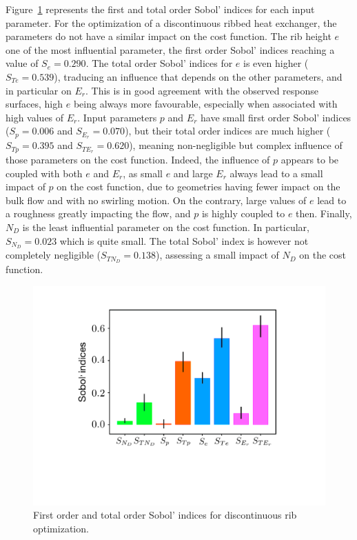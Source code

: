 Figure~\ref{sensitivity} represents the first and total order Sobol' indices for each input parameter. For the optimization of a discontinuous ribbed heat exchanger, the parameters do not have a similar impact on the cost function. The rib height $e$ one of the most influential parameter, the first order Sobol' indices reaching a value of $S_e = 0.290$. The total order Sobol' indices for $e$ is even higher ($S_{Te} = 0.539$), traducing an influence that depends on the other parameters, and in particular on $E_r$. This is in good agreement with the observed response surfaces, high $e$ being always more favourable, especially when associated with high values of $E_r$. Input parameters $p$ and $E_r$ have small first order Sobol' indices ($S_p = 0.006$ and $S_{E_r} = 0.070$), but their total order indices are much higher ($S_{Tp} = 0.395$ and $S_{TE_r} = 0.620$), meaning non-negligible but complex influence of those parameters on the cost function. Indeed, the influence of $p$ appears to be coupled with both $e$ and $E_r$, as small $e$ and large $E_r$ always lead to a small impact of $p$ on the cost function, due to geometries having fewer impact on the bulk flow and with no swirling motion. On the contrary, large values of $e$ lead to a roughness greatly impacting the flow, and $p$ is highly coupled to $e$ then. Finally, $N_D$ is the least influential parameter on the cost function. In particular, $S_{N_D} = 0.023$ which is quite small. The total Sobol' index is however not completely negligible ($S_{TN_D} = 0.138$), assessing a small impact of $N_D$ on the cost function.\\

\begin{figure}[!h]
\centering
\includegraphics[width=0.6\linewidth,keepaspectratio]{fig/applications/optim/Sobol_discontinu.pdf}
\caption{First order and total order Sobol' indices for discontinuous rib optimization.}
\label{sensitivity}
\end{figure}

